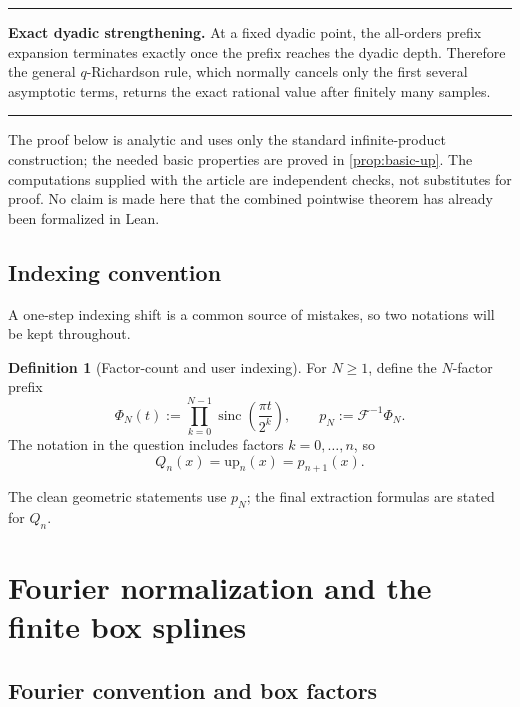 \documentclass[11pt,oneside]{article}
\numberwithin{equation}{section}
\theoremstyle{definition}
\newtheorem{definition}[theorem]{Definition}
\theoremstyle{remark}
\newcommand{\upf}{\mathrm{up}}
\newcommand{\sinc}{\operatorname{sinc}}
\newcommand{\F}{\mathcal{F}}
\newenvironment{mainresult}{%
  \par\medskip\noindent\begin{center}\begin{minipage}{0.94\textwidth}%
  \color{black}\hrule\vspace{0.7em}
}{%
  \vspace{0.7em}\hrule\end{minipage}\end{center}\medskip
}
\begin{document}
\begin{mainresult}
\textbf{Exact dyadic strengthening.}
At a fixed dyadic point, the all-orders prefix expansion terminates exactly once
the prefix reaches the dyadic depth.  Therefore the general $q$-Richardson rule,
which normally cancels only the first several asymptotic terms, returns the exact
rational value after finitely many samples.
\end{mainresult}

The proof below is analytic and uses only the standard infinite-product
construction; the needed basic properties are proved in \cref{prop:basic-up}.
The computations supplied with the article are independent checks, not
substitutes for proof.  No claim is made here that the combined pointwise theorem
has already been formalized in Lean.

\subsection{Indexing convention}

A one-step indexing shift is a common source of mistakes, so two notations will
be kept throughout.

\begin{definition}[Factor-count and user indexing]
For $N\ge1$, define the $N$-factor prefix
\begin{equation}
 \Phi_N(t):=\prod_{k=0}^{N-1}\sinc\!\left(\frac{\pi t}{2^k}\right),
 \qquad p_N:=\F^{-1}\Phi_N.
 \label{eq:pN-def}
\end{equation}
The notation in the question includes factors $k=0,\ldots,n$, so
\begin{equation}
 Q_n(x)=\upf_n(x)=p_{n+1}(x).
 \label{eq:user-index-shift}
\end{equation}
\end{definition}

The clean geometric statements use $p_N$; the final extraction formulas are
stated for $Q_n$.

\section{Fourier normalization and the finite box splines}

\subsection{Fourier convention and box factors}
\end{document}
